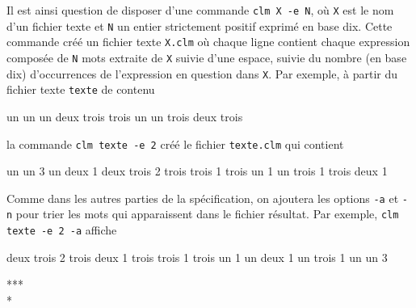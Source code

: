 \documentclass[11pt]{article}
\theoremstyle{definition}
\begin{document}
Il est ainsi question de disposer d'une commande {\tt clm X -e N}, où
{\tt X} est le nom d'un fichier texte et {\tt N} un entier strictement
positif exprimé en base dix. Cette commande créé un fichier texte
{\tt X.clm} où chaque ligne contient chaque expression composée de
{\tt N} mots extraite de {\tt X} suivie d'une espace, suivie du nombre
(en base dix) d'occurrences de l'expression en question dans {\tt X}.
Par exemple, à partir du fichier texte {\tt texte} de contenu
\begin{center} \footnotesize
\begin{boxedverbatim}
un un un deux trois trois
un un trois deux trois
\end{boxedverbatim}
\end{center}
la commande {\tt clm texte -e 2} créé le fichier {\tt texte.clm} qui
contient
\begin{center} \footnotesize
\begin{boxedverbatim}
un un 3
un deux 1
deux trois 2
trois trois 1
trois un 1
un trois 1
trois deux 1
\end{boxedverbatim}
\end{center}
Comme dans les autres parties de la spécification, on ajoutera les options
{\tt -a} et {\tt -n} pour trier les mots qui apparaissent dans le
fichier résultat. Par exemple, {\tt clm texte -e 2 -a} affiche
\begin{center} \footnotesize
\begin{boxedverbatim}
deux trois 2
trois deux 1
trois trois 1
trois un 1
un deux 1
un trois 1
un un 3
\end{boxedverbatim}
\end{center}
\medskip

\begin{center} *** \\ * \end{center}
\bigskip
\bigskip
\end{document}
